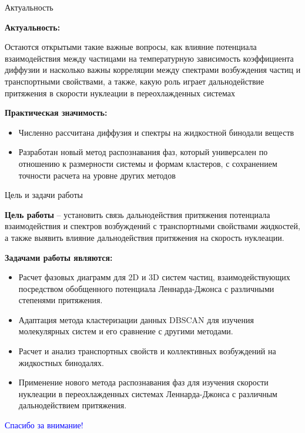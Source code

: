 \documentclass{beamer} %
\begin{document}
\begin{frame}{Актуальность}
  \footnotesize{

    \textbf{Актуальность:}

    Остаются открытыми такие важные вопросы, как влияние потенциала взаимодействия между частицами на температурную зависимость коэффициента диффузии и насколько важны корреляции между спектрами возбуждения частиц и транспортными свойствами, а также, какую роль играет дальнодействие притяжения в скорости нуклеации в переохлажденных системах

    \vspace{1cm}

    \textbf{Практическая значимость:}

    \begin{itemize}
    \item Численно рассчитана диффузия и спектры на жидкостной бинодали веществ
    \item Разработан новый метод распознавания фаз, который универсален по отношению к размерности системы и формам кластеров, с сохранением точности расчета на уровне других методов
    \end{itemize}
  }
\end{frame}




\begin{frame}{Цель и задачи работы}
  \footnotesize{

    \textbf{Цель работы} -- установить связь дальнодействия притяжения потенциала взаимодействия и спектров возбуждений с транспортными свойствами жидкостей, а также выявить влияние дальнодействия притяжения на скорость нуклеации.

    \vspace{0.5cm}

    \textbf{Задачами работы являются:}
    \begin{itemize}
    \item Расчет фазовых диаграмм для 2D и 3D систем частиц, взаимодействующих посредством обобщенного потенциала Леннарда-Джонса с различными степенями притяжения.
    \item Адаптация метода кластеризации данных DBSCAN для изучения молекулярных систем и его сравнение с другими методами.
    \item Расчет и анализ транспортных свойств и коллективных возбуждений на жидкостных бинодалях.
    \item Применение нового метода распознавания фаз для изучения скорости нуклеации в переохлажденных системах Леннарда-Джонса с различным дальнодействием притяжения.
    \end{itemize}
  }
\end{frame}


\begin{frame}
  \centering \Huge \textcolor{blue}{Спасибо за внимание!}
\end{frame}
\end{document}
